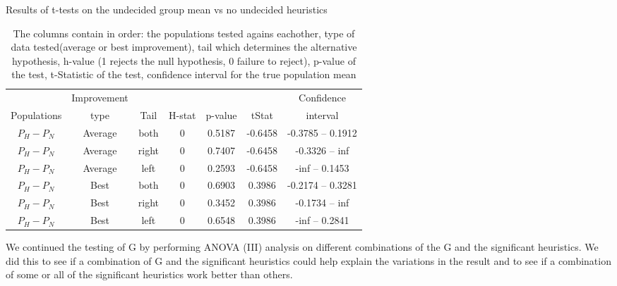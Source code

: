 \documentclass[../main.tex]{subfiles}
\begin{document}
\begin{table}
    \centering
    \caption{Results of t-tests on the undecided group mean vs no undecided heuristics}
        \begin{tabular}{ccccccc}
        \hline
                                & Improvement   &       &           &           & & Confidence\\ 
            Populations         & type          & Tail  &H-stat     & p-value   & tStat & interval \\ 
        \hline                
        $P_H-P_N$   & Average   & both  & 0 & 0.5187    & -0.6458   & -0.3785 -- 0.1912\\
        $P_H-P_N$   & Average   & right & 0 & 0.7407    & -0.6458   & -0.3326 -- inf   \\
        $P_H-P_N$   & Average   & left  & 0 & 0.2593    & -0.6458   & -inf -- 0.1453   \\
        $P_H-P_N$   & Best      & both  & 0 & 0.6903    & 0.3986    & -0.2174 -- 0.3281 \\
        $P_H-P_N$   & Best      & right & 0 & 0.3452    & 0.3986    & -0.1734 -- inf    \\
        $P_H-P_N$   & Best      & left  & 0 & 0.6548    & 0.3986    & -inf -- 0.2841    \\
       \hline
        \end{tabular}
    \caption*{The columns contain in order: the populations tested agains eachother, type of data tested(average or best improvement), tail which determines the alternative hypothesis, h-value (1 rejects the null hypothesis, 0 failure to reject), p-value of the test, t-Statistic of the test, confidence interval for the true population mean}
   \label{tab:tTestGroup}
\end{table}

We continued the testing of G by performing ANOVA (III) analysis on different combinations of the G and the significant heuristics. 
We did this to see if a combination of G and the significant heuristics could help explain the variations in the result and to see if a combination of some or all of the significant heuristics work better than others.
\end{document}
